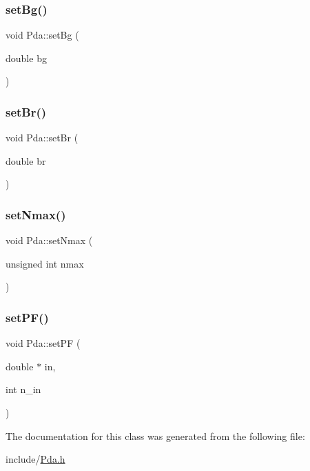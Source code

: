 \subsubsection{\texorpdfstring{set\+Bg()}{setBg()}}
{\footnotesize\ttfamily void Pda\+::set\+Bg (\begin{DoxyParamCaption}\item[{double}]{bg }\end{DoxyParamCaption})}

\mbox{\label{class_pda_a8890b9df42265440d7ce534bb8a95887}} 
\subsubsection{\texorpdfstring{set\+Br()}{setBr()}}
{\footnotesize\ttfamily void Pda\+::set\+Br (\begin{DoxyParamCaption}\item[{double}]{br }\end{DoxyParamCaption})}

\mbox{\label{class_pda_a76f55e8d719aaace0f26ed1b47ed0bb4}} 
\subsubsection{\texorpdfstring{set\+Nmax()}{setNmax()}}
{\footnotesize\ttfamily void Pda\+::set\+Nmax (\begin{DoxyParamCaption}\item[{unsigned int}]{nmax }\end{DoxyParamCaption})}

\mbox{\label{class_pda_adf5dfce658c8816392b933c3571520ea}} 
\subsubsection{\texorpdfstring{set\+P\+F()}{setPF()}}
{\footnotesize\ttfamily void Pda\+::set\+PF (\begin{DoxyParamCaption}\item[{double $\ast$}]{in,  }\item[{int}]{n\+\_\+in }\end{DoxyParamCaption})}



The documentation for this class was generated from the following file\+:\begin{DoxyCompactItemize}
\item 
include/\hyperlink{_pda_8h}{Pda.\+h}\end{DoxyCompactItemize}
